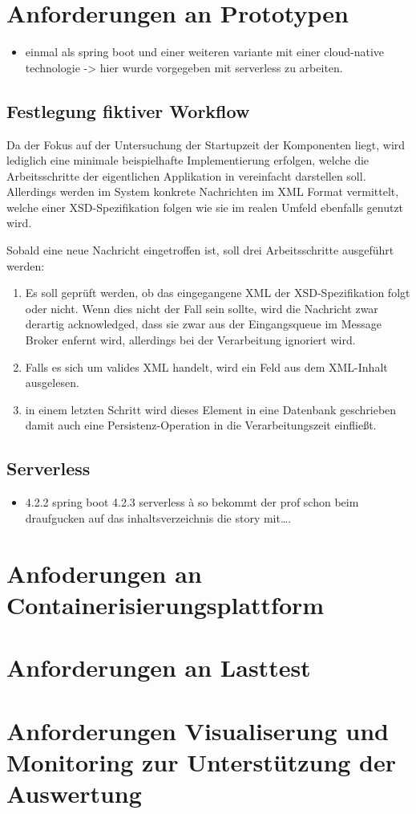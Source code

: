 \section{Anforderungen an Prototypen}
\begin{itemize}
  \item einmal als spring boot und einer weiteren variante mit einer cloud-native technologie -> hier wurde vorgegeben mit serverless zu arbeiten.
\end{itemize}

\subsection{Festlegung fiktiver Workflow}
Da der Fokus auf der Untersuchung der Startupzeit der Komponenten liegt, wird lediglich eine minimale beispielhafte Implementierung erfolgen, welche die Arbeitsschritte der eigentlichen Applikation in vereinfacht darstellen soll. Allerdings werden im System konkrete Nachrichten im XML Format vermittelt, welche einer XSD-Spezifikation folgen wie sie im realen Umfeld ebenfalls genutzt wird. 


Sobald eine neue Nachricht eingetroffen ist, soll drei Arbeitsschritte ausgeführt werden:

\begin{enumerate}

  \item Es soll geprüft werden, ob das eingegangene XML der XSD-Spezifikation folgt oder nicht. Wenn dies nicht der Fall sein sollte, wird die Nachricht zwar derartig acknowledged, dass sie zwar aus der Eingangsqueue im Message Broker enfernt wird, allerdings bei der Verarbeitung ignoriert wird.

  \item Falls es sich um valides XML handelt, wird ein Feld aus dem XML-Inhalt ausgelesen.

  \item in einem letzten Schritt wird dieses Element in eine Datenbank geschrieben damit auch eine Persistenz-Operation in die Verarbeitungszeit einfließt.

\end{enumerate}

\subsection{Serverless}
\begin{itemize}
  \item  4.2.2 spring boot 4.2.3 serverless à so bekommt der prof schon beim draufgucken auf das inhaltsverzeichnis die story mit….
\end{itemize}

\section{Anfoderungen an Containerisierungsplattform}
\section{Anforderungen an Lasttest}
\section{Anforderungen Visualiserung und Monitoring zur Unterstützung der Auswertung}

